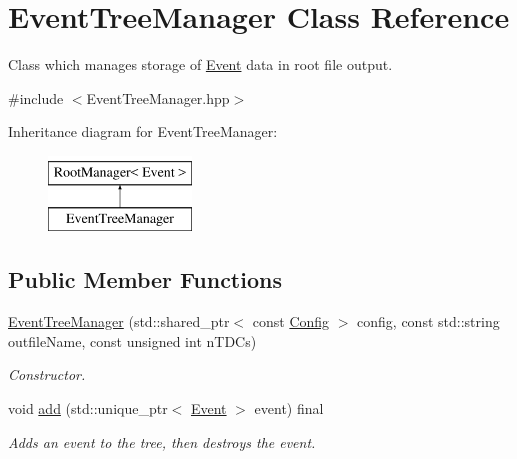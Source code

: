 \hypertarget{class_event_tree_manager}{}\section{Event\+Tree\+Manager Class Reference}
\label{class_event_tree_manager}


Class which manages storage of \hyperlink{class_event}{Event} data in root file output.  




{\ttfamily \#include $<$Event\+Tree\+Manager.\+hpp$>$}

Inheritance diagram for Event\+Tree\+Manager\+:\begin{figure}[H]
\begin{center}
\leavevmode
\includegraphics[height=2.000000cm]{class_event_tree_manager}
\end{center}
\end{figure}
\subsection*{Public Member Functions}
\begin{DoxyCompactItemize}
\item 
\hyperlink{class_event_tree_manager_ac56641a71c28863d76fcc598ac8e32df}{Event\+Tree\+Manager} (std\+::shared\+\_\+ptr$<$ const \hyperlink{class_config}{Config} $>$ config, const std\+::string outfile\+Name, const unsigned int n\+T\+D\+Cs)
\begin{DoxyCompactList}\small\item\em Constructor. \end{DoxyCompactList}\item 
void \hyperlink{class_event_tree_manager_acabb2f6c8dd0e08375b4cf8bf2c148fd}{add} (std\+::unique\+\_\+ptr$<$ \hyperlink{class_event}{Event} $>$ event) final
\begin{DoxyCompactList}\small\item\em Adds an event to the tree, then destroys the event. \end{DoxyCompactList}\end{DoxyCompactItemize}
